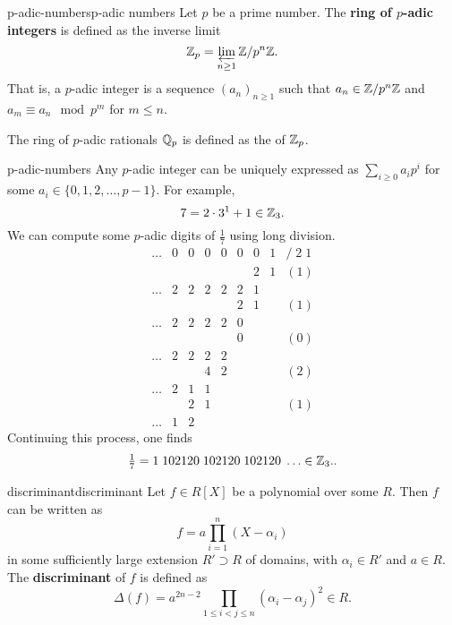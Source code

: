 \begin{topic}{p-adic-numbers}{p-adic numbers}
    Let $p$ be a prime number. The \textbf{ring of $p$-adic integers} is defined as the inverse limit
    \[ \mathbb{Z}_p = \varprojlim_{n \ge 1} \mathbb{Z} / p^n \mathbb{Z} . \]
    That is, a $p$-adic integer is a sequence $(a_n)_{n \ge 1}$ such that $a_n \in \mathbb{Z} / p^n \mathbb{Z}$ and $a_m \equiv a_n \mod p^m$ for $m \le n$.
    
    The ring of $p$-adic rationals $\mathbb{Q}_p$ is defined as the  of $\mathbb{Z}_p$.
\end{topic}

\begin{example}{p-adic-numbers}
    Any $p$-adic integer can be uniquely expressed as $\sum_{i \ge 0} a_i p^i$ for some $a_i \in \{ 0, 1, 2, \ldots, p - 1 \}$. For example,
    \[ 7 = 2 \cdot 3^1 + 1 \in \mathbb{Z}_3 . \]
    We can compute some $p$-adic digits of $\tfrac{1}{7}$ using long division.
    \[ \begin{array}{ccccccccl}
        \ldots & 0 & 0 & 0 & 0 & 0 & 0 & 1 & / \; 2 \; 1 \\
               &   &   &   &   &   & 2 & 1 & (1) \\ \hline
        \ldots & 2 & 2 & 2 & 2 & 2 & 1 \\
               &   &   &   &   & 2 & 1 &   & (1) \\ \hline
        \ldots & 2 & 2 & 2 & 2 & 0 \\
               &   &   &   &   & 0 &   &   & (0) \\ \hline
        \ldots & 2 & 2 & 2 & 2 \\
               &   &   & 4 & 2 &   &   &   & (2) \\ \hline
        \ldots & 2 & 1 & 1 \\
               &   & 2 & 1 &   &   &   &   & (1) \\ \hline
        \ldots & 1 & 2
    \end{array} \]
    Continuing this process, one finds
    \[ \tfrac{1}{7} = 1 \; 1 0 2 1 2 0 \; 1 0 2 1 2 0 \; 1 0 2 1 2 0 \; \ldots \in \mathbb{Z}_3 . . \]
\end{example}

\begin{topic}{discriminant}{discriminant}
    Let $f \in R[X]$ be a polynomial over some  $R$. Then $f$ can be written as
    \[ f = a \prod_{i = 1}^n (X - \alpha_i) \]
    in some sufficiently large extension $R' \supset R$ of domains, with $\alpha_i \in R'$ and $a \in R$. The \textbf{discriminant} of $f$ is defined as
    \[ \Delta(f) = a^{2n - 2} \prod_{1 \le i < j \le n} (\alpha_i - \alpha_j)^2 \in R . \]
\end{topic}

